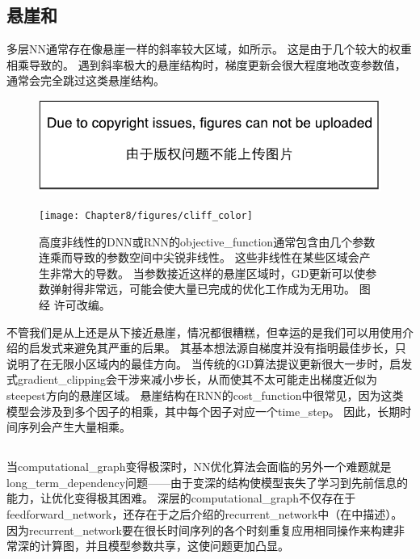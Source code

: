 \subsection{悬崖和}
\label{sec:cliffs_and_exploding_gradients}
多层\gls{NN}通常存在像悬崖一样的斜率较大区域，如所示。
这是由于几个较大的权重相乘导致的。
遇到斜率极大的悬崖结构时，梯度更新会很大程度地改变参数值，通常会完全跳过这类悬崖结构。


\begin{figure}[!htb]
\ifOpenSource
\centerline{\includegraphics{figure.pdf}}
\else
\centerline{\texttt{[image: Chapter8/figures/cliff\_color]}}
\fi
\caption{高度非线性的\gls{DNN}或\gls{RNN}的\gls{objective_function}通常包含由几个参数连乘而导致的参数空间中尖锐非线性。
这些非线性在某些区域会产生非常大的导数。
当参数接近这样的悬崖区域时，\gls{GD}更新可以使参数弹射得非常远，可能会使大量已完成的优化工作成为无用功。
图经 \citet{Pascanu+al-ICML2013-small}许可改编。}
\label{fig:chap8_cliff}
\end{figure}


不管我们是从上还是从下接近悬崖，情况都很糟糕，但幸运的是我们可以用使用介绍的启发式来避免其严重的后果。
其基本想法源自梯度并没有指明最佳步长，只说明了在无限小区域内的最佳方向。
当传统的\gls{GD}算法提议更新很大一步时，启发式\gls{gradient_clipping}会干涉来减小步长，从而使其不太可能走出梯度近似为\gls{steepest}方向的悬崖区域。
悬崖结构在\gls{RNN}的\gls{cost_function}中很常见，因为这类模型会涉及到多个因子的相乘，其中每个因子对应一个\gls{time_step}。
因此，长期时间序列会产生大量相乘。


\subsection{}
\label{sec:long_term_dependencies}
当\gls{computational_graph}变得极深时，\gls{NN}优化算法会面临的另外一个难题就是\gls{long_term_dependency}问题——由于变深的结构使模型丧失了学习到先前信息的能力，让优化变得极其困难。 
深层的\gls{computational_graph}不仅存在于\gls{feedforward_network}，还存在于之后介绍的\gls{recurrent_network}中（在中描述）。
因为\gls{recurrent_network}要在很长时间序列的各个时刻重复应用相同操作来构建非常深的计算图，并且模型参数共享，这使问题更加凸显。

